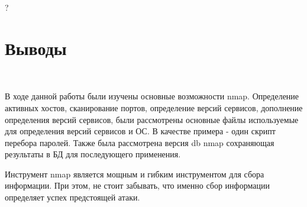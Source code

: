 \documentclass{article}
\begin{document}
?

\section{Выводы}
~

В ходе данной работы были изучены основные возможности nmap. Определение активных хостов, сканирование портов, определение версий сервисов, дополнение определения версий сервисов, были рассмотрены основные файлы используемые для определения версий сервисов и ОС. В качестве примера - один скрипт перебора паролей. Также была рассмотрена версия db nmap сохраняющая результаты в БД для последующего применения. 

Инструмент nmap является мощным и гибким инструментом для сбора информации. При этом, не стоит забывать, что именно сбор информации определяет успех предстоящей атаки.
 
\end{document}
